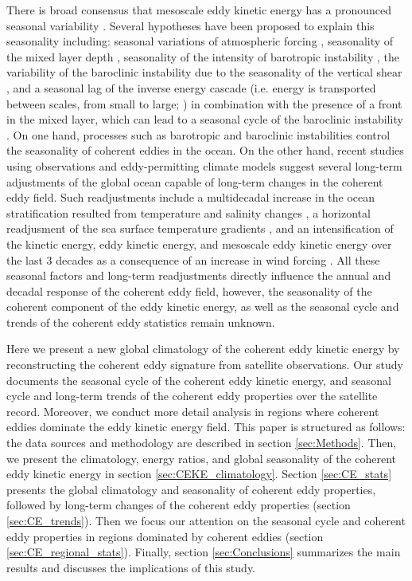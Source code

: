 \documentclass[draft,linenumbers]{agujournal2019}
\begin{document}
There is broad consensus that mesoscale eddy kinetic energy has a pronounced seasonal variability \citep{Uchida_Seasonality_2017,Kang_On_2017,Qiu_seasonal_2004, Qiu_seasonal_1999}. 
Several hypotheses have been proposed to explain this seasonality including: seasonal variations of atmospheric forcing \citep{Sasaki_seasonal_2014}, seasonality of the mixed layer depth \citep{Qiu_seasonal_2014,Callies_season_2015}, seasonality of the intensity of barotropic instability \citep{Qiu_seasonal_2004}, the variability of the baroclinic instability due to the seasonality of the vertical shear \citep{Qiu_seasonal_1999}, and a seasonal lag of the inverse energy cascade (i.e. energy is transported between scales, from small to large; \citealp{Arbic_cascade_2013}) in combination with the presence of a front in the mixed layer, which can lead to a seasonal cycle of the baroclinic instability \citep{Qiu_seasonal_2014}. On one hand, processes such as barotropic and baroclinic instabilities control the seasonality of coherent eddies in the ocean. 
On the other hand, recent studies using observations and eddy-permitting climate models suggest several long-term adjustments of the global ocean capable of long-term changes in the coherent eddy field. 
Such readjustments include a multidecadal increase in the ocean stratification resulted from temperature and salinity changes \citep{Li_stratification_2020}, a horizontal readjusment of the sea surface temperature gradients \citep{Ruela_SST_trends_2020,Bouali_SST_grad_trends_2017,Cane_sst_trends_1997}, and an intensification of the kinetic energy, eddy kinetic energy, and mesoscale eddy kinetic energy over the last 3 decades as a consequence of an increase in wind forcing \citep{Hu_acceleration_2020,Wunsch_speeding_2020,Martinez_Kinetic_2021}. 
All these seasonal factors and long-term readjustments directly influence the annual and decadal response of the coherent eddy field, however, the seasonality of the coherent component of the eddy kinetic energy, as well as the seasonal cycle and trends of the coherent eddy statistics remain unknown.

Here we present a new global climatology of the coherent eddy kinetic energy by reconstructing the coherent eddy signature from satellite observations. Our study documents the seasonal cycle of the coherent eddy kinetic energy, and seasonal cycle and long-term trends of the coherent eddy properties over the satellite record. 
Moreover, we conduct more detail analysis in regions where coherent eddies dominate the eddy kinetic energy field. 
This paper is structured as follows:  the data sources and methodology are described in section \ref{sec:Methods}.
Then, we present the climatology, energy ratios, and global seasonality of the coherent eddy kinetic energy in section \ref{sec:CEKE_climatology}. 
Section \ref{sec:CE_stats} presents the global climatology and seasonality of coherent eddy properties, followed by long-term changes of the coherent eddy properties (section \ref{sec:CE_trends}). Then we focus our attention on the seasonal cycle and coherent eddy properties in regions dominated by coherent eddies (section \ref{sec:CE_regional_stats}). 
Finally, section \ref{sec:Conclusions} summarizes the main results and discusses the implications of this study.
\end{document}
